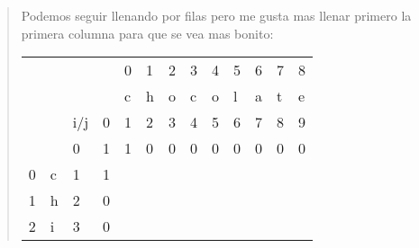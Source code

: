 \begin{quote}
    Podemos seguir llenando por filas pero me gusta mas llenar primero la primera columna para que se vea mas bonito:
    \begin{table}[H]
        \centering
        \begin{tabular}{lllllllllllll}
            &   &                        &                        & 0                      & 1                      & 2                      & 3                      & 4                      & 5                      & 6                      & 7                      & 8                      \\
            &   &                        &                        & c                      & h                      & o                      & c                      & o                      & l                      & a                      & t                      & e                      \\
            &   & i/j                    & 0                      & 1                      & 2                      & 3                      & 4                      & 5                      & 6                      & 7                      & 8                      & 9                      \\ \cline{4-13} 
            &   & \multicolumn{1}{l|}{0} & \multicolumn{1}{l|}{1} & \multicolumn{1}{l|}{1} & \multicolumn{1}{l|}{0} & \multicolumn{1}{l|}{0} & \multicolumn{1}{l|}{0} & \multicolumn{1}{l|}{0} & \multicolumn{1}{l|}{0} & \multicolumn{1}{l|}{0} & \multicolumn{1}{l|}{0} & \multicolumn{1}{l|}{0} \\ \cline{4-13} 
          0 & c & \multicolumn{1}{l|}{1} & \multicolumn{1}{l|}{1} & \multicolumn{1}{l|}{}  & \multicolumn{1}{l|}{}  & \multicolumn{1}{l|}{}  & \multicolumn{1}{l|}{}  & \multicolumn{1}{l|}{}  & \multicolumn{1}{l|}{}  & \multicolumn{1}{l|}{}  & \multicolumn{1}{l|}{}  & \multicolumn{1}{l|}{}  \\ \cline{4-13} 
          1 & h & \multicolumn{1}{l|}{2} & \multicolumn{1}{l|}{0} & \multicolumn{1}{l|}{}  & \multicolumn{1}{l|}{}  & \multicolumn{1}{l|}{}  & \multicolumn{1}{l|}{}  & \multicolumn{1}{l|}{}  & \multicolumn{1}{l|}{}  & \multicolumn{1}{l|}{}  & \multicolumn{1}{l|}{}  & \multicolumn{1}{l|}{}  \\ \cline{4-13} 
          2 & i & \multicolumn{1}{l|}{3} & \multicolumn{1}{l|}{0} & \multicolumn{1}{l|}{}  & \multicolumn{1}{l|}{}  & \multicolumn{1}{l|}{}  & \multicolumn{1}{l|}{}  & \multicolumn{1}{l|}{}  & \multicolumn{1}{l|}{}  & \multicolumn{1}{l|}{}  & \multicolumn{1}{l|}{}  & \multicolumn{1}{l|}{}  \\ \cline{4-13} 

\end{tabular}
\end{table}
\end{quote}
